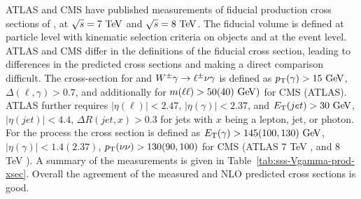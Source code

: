 ATLAS and CMS have published measurements of fiducial production cross sections of
\Wglvg, \Zgllg at $\rts=7\TeV$ and $\rts=8\TeV$. 
The fiducial volume is defined at particle level with kinematic selection criteria 
on objects and at the event level. ATLAS and CMS differ in the definitions 
of the fiducial cross section, leading to differences in the predicted cross sections
and making a direct comparison difficult. 
The cross-section for \Zgllg\; and $W^{\pm}\gamma \rightarrow \ell^\pm \nu \gamma $ is defined as 
$\pt(\gamma)>15\GeV$,$\Delta(\ell,\gamma)>0.7$, and additionally for \Zg\; $m(\ell\ell)>50 (40) \GeV)$ 
for CMS (ATLAS). ATLAS further requires $|\eta(\ell)|<2.47$,  $|\eta(\gamma)|<2.37$, and 
$\ET(jet) >30\GeV$, $|\eta(jet)|<4.4$, $\Delta R (jet,x) > 0.3$ for jets with $x$ being a lepton, jet, or photon. 
For the \Zgvvg\; process the cross section is defined as $\ET(\gamma)>145 (100, 130)\GeV$, 
$|\eta(\gamma)|<1.4(2.37)$, $p_{\mathrm{T}}(\nu\nu)>130(90, 100)$ for CMS (ATLAS 7 TeV \cite{Chatrchyan:2013nda}, and 8 TeV \cite{Aad:2016sau}).
A summary of the measurements is given in Table~\ref{tab:sss-Vgamma-prod-xsec}. Overall the agreement
of the measured and NLO predicted cross sections is good. 

